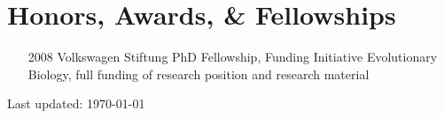 




\section*{Honors, Awards, \& Fellowships}

\begin{itemize}
\item [2008] Volkswagen Stiftung PhD Fellowship, Funding Initiative
  Evolutionary Biology, full funding of research position and research
  material
\end{itemize}



\begin{center}
  \begin{small}
    Last updated: \today
  \end{small}
\end{center}

